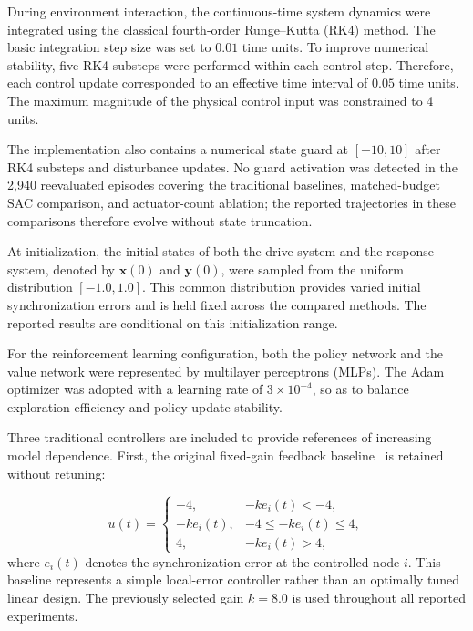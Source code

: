 \documentclass[a4paper,fleqn]{cas-sc}
\theoremstyle{plain}
\theoremstyle{definition}
\begin{document}
During environment interaction, the continuous-time system dynamics were integrated using the classical fourth-order Runge--Kutta (RK4) method. The basic integration step size was set to $0.01$ time units. To improve numerical stability, five RK4 substeps were performed within each control step. Therefore, each control update corresponded to an effective time interval of $0.05$ time units. The maximum magnitude of the physical control input was constrained to 4 units.

The implementation also contains a numerical state guard at $[-10,10]$ after RK4 substeps and disturbance updates. No guard activation was detected in the 2,940 reevaluated episodes covering the traditional baselines, matched-budget SAC comparison, and actuator-count ablation; the reported trajectories in these comparisons therefore evolve without state truncation.

At initialization, the initial states of both the drive system and the response system, denoted by $\mathbf{x}(0)$ and $\mathbf{y}(0)$, were sampled from the uniform distribution $[-1.0,1.0]$. This common distribution provides varied initial synchronization errors and is held fixed across the compared methods. The reported results are conditional on this initialization range.

For the reinforcement learning configuration, both the policy network and the value network were represented by multilayer perceptrons (MLPs). The Adam optimizer was adopted with a learning rate of $3\times 10^{-4}$, so as to balance exploration efficiency and policy-update stability.

Three traditional controllers are included to provide references of increasing model dependence. First, the original fixed-gain feedback baseline~\cite{yassen2005controlling} is retained without retuning:

\begin{equation}
	u(t)=
	\begin{cases}
		-4, & -k e_i(t)<-4,\\
		-k e_i(t), & -4\leq -k e_i(t)\leq 4,\\
		4, & -k e_i(t)>4,
	\end{cases}
	\label{eq:linear_feedback_baseline}
\end{equation}
where $e_i(t)$ denotes the synchronization error at the controlled node $i$. This baseline represents a simple local-error controller rather than an optimally tuned linear design. The previously selected gain $k=8.0$ is used throughout all reported experiments.
\end{document}
